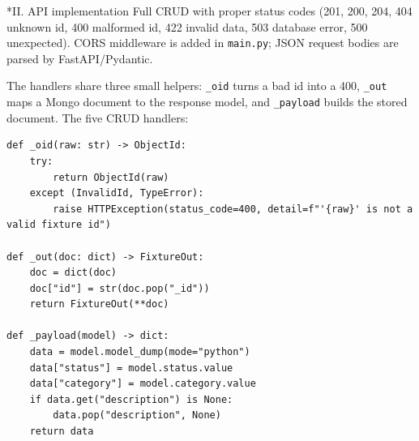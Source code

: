 \documentclass[11pt]{article}
\makeatletter
\renewcommand\subsection{\@startsection{subsection}{2}{\z@}{-2.2ex \@plus -1ex \@minus -.2ex}{0.8ex \@plus.2ex}{\normalfont\fontsize{12}{14.5}\selectfont\bfseries}}
\makeatother
\begin{document}
\subsection*{II. API implementation}
Full CRUD with proper status codes (201, 200, 204, 404 unknown id, 400 malformed id, 422 invalid data, 503 database error, 500 unexpected). CORS middleware is added in \verb|main.py|; JSON request bodies are parsed by FastAPI/Pydantic.

The handlers share three small helpers: \verb|_oid| turns a bad id into a 400, \verb|_out| maps a Mongo document to the response model, and \verb|_payload| builds the stored document. The five CRUD handlers:

\begingroup\lstset{basicstyle=\ttfamily\scriptsize}
\begin{lstlisting}
def _oid(raw: str) -> ObjectId:
    try:
        return ObjectId(raw)
    except (InvalidId, TypeError):
        raise HTTPException(status_code=400, detail=f"'{raw}' is not a valid fixture id")

def _out(doc: dict) -> FixtureOut:
    doc = dict(doc)
    doc["id"] = str(doc.pop("_id"))
    return FixtureOut(**doc)

def _payload(model) -> dict:
    data = model.model_dump(mode="python")
    data["status"] = model.status.value
    data["category"] = model.category.value
    if data.get("description") is None:
        data.pop("description", None)
    return data
\end{lstlisting}
\endgroup
\begingroup\lstset{basicstyle=\ttfamily\scriptsize}
\end{document}
